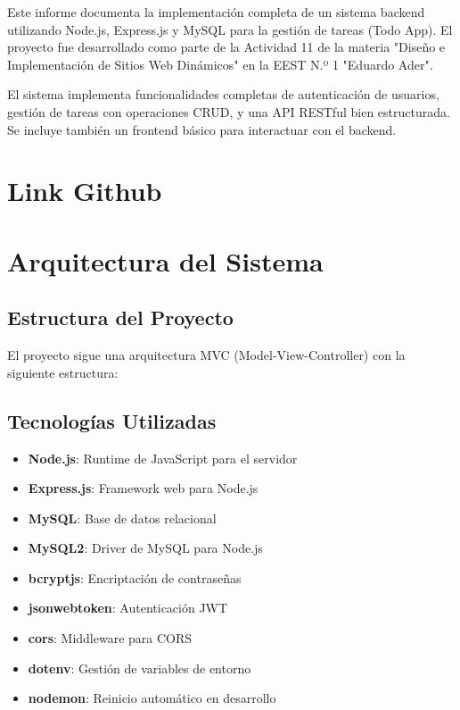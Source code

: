 \documentclass[12pt,a4paper]{article}
\begin{document}
Este informe documenta la implementación completa de un sistema backend utilizando Node.js, Express.js y MySQL para la gestión de tareas (Todo App). El proyecto fue desarrollado como parte de la Actividad 11 de la materia "Diseño e Implementación de Sitios Web Dinámicos" en la EEST N.º 1 "Eduardo Ader".

El sistema implementa funcionalidades completas de autenticación de usuarios, gestión de tareas con operaciones CRUD, y una API RESTful bien estructurada. Se incluye también un frontend básico para interactuar con el backend.

\section{Link Github}



\section{Arquitectura del Sistema}

\subsection{Estructura del Proyecto}

El proyecto sigue una arquitectura MVC (Model-View-Controller) con la siguiente estructura:



\subsection{Tecnologías Utilizadas}

\begin{itemize}
    \item \textbf{Node.js}: Runtime de JavaScript para el servidor
    \item \textbf{Express.js}: Framework web para Node.js
    \item \textbf{MySQL}: Base de datos relacional
    \item \textbf{MySQL2}: Driver de MySQL para Node.js
    \item \textbf{bcryptjs}: Encriptación de contraseñas
    \item \textbf{jsonwebtoken}: Autenticación JWT
    \item \textbf{cors}: Middleware para CORS
    \item \textbf{dotenv}: Gestión de variables de entorno
    \item \textbf{nodemon}: Reinicio automático en desarrollo
\end{itemize}
\end{document}

